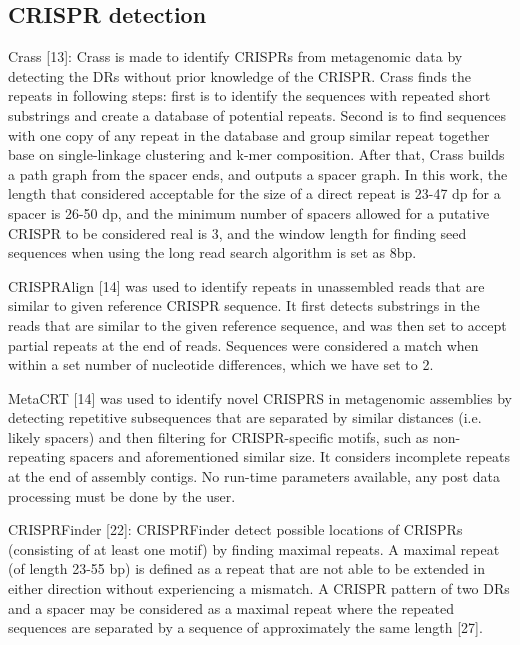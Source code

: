 \documentclass{bmcart}
\begin{document}
\subsection*{CRISPR detection}
Crass  [13]: Crass is made to identify CRISPRs from metagenomic data by detecting the DRs without prior knowledge of the CRISPR. Crass finds the repeats in following steps: first is to identify the sequences with repeated short substrings and create a database of potential repeats. Second is to find sequences with one copy of any repeat in the database and group similar repeat together base on single-linkage clustering and k-mer composition. After that, Crass builds a path graph from the spacer ends, and outputs a spacer graph. In this work, the length that considered acceptable for the size of a direct repeat is 23-47 dp for a spacer is 26-50 dp, and the minimum number of spacers allowed for a putative  CRISPR  to  be  considered  real is 3, and the window length for finding seed sequences when  using  the  long  read  search  algorithm is set as 8bp.

CRISPRAlign [14] was used to identify repeats in unassembled reads that are similar to given reference CRISPR sequence. It first detects substrings in the reads that are similar to the given reference sequence, and was then set to accept partial repeats at the end of reads. Sequences were considered a match when within a set number of nucleotide differences, which we have set to 2.

MetaCRT [14] was used to identify novel CRISPRS in metagenomic assemblies by detecting repetitive subsequences that are separated by similar distances (i.e. likely spacers) and then filtering for CRISPR-specific motifs, such as non-repeating spacers and aforementioned similar size. It considers incomplete repeats at the end of assembly contigs. No run-time parameters available, any post data processing must be done by the user.
 
CRISPRFinder  [22]: CRISPRFinder detect possible locations of CRISPRs (consisting of at least one motif) by finding maximal repeats. A maximal repeat (of length 23-55 bp) is defined as a repeat that are not able to be extended in either direction without experiencing a mismatch. A CRISPR pattern of two DRs and a spacer may be considered as a maximal repeat where the repeated sequences are separated by a sequence of approximately the same length [27].
\end{document}
